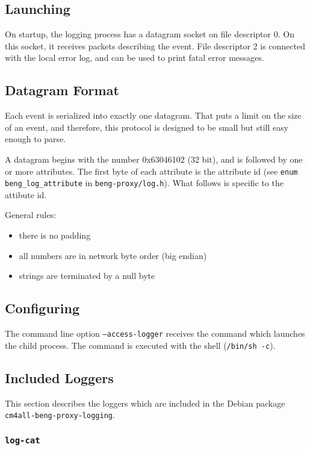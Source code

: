 \documentclass[a4paper,12pt]{article}
\begin{document}
\subsection{Launching}

On startup, the logging process has a datagram socket on file
descriptor 0.  On this socket, it receives packets describing the
event.  File descriptor 2 is connected with the local error log, and
can be used to print fatal error messages.

\subsection{Datagram Format}

Each event is serialized into exactly one datagram.  That puts a limit
on the size of an event, and therefore, this protocol is designed to
be small but still easy enough to parse.

A datagram begins with the number 0x63046102 (32 bit), and is followed
by one or more attributes.  The first byte of each attribute is the
attribute id (see \texttt{enum beng\_log\_attribute} in
\texttt{beng-proxy/log.h}).  What follows is specific to the attibute
id.

General rules:

\begin{itemize}
\item there is no padding
\item all numbers are in network byte order (big endian)
\item strings are terminated by a null byte
\end{itemize}

\subsection{Configuring}

The command line option \texttt{--access-logger} receives the command
which launches the child process.  The command is executed with the
shell (\texttt{/bin/sh -c}).

\subsection{Included Loggers}

This section describes the loggers which are included in the Debian
package \texttt{cm4all-beng-proxy-logging}.

\subsubsection{\texttt{log-cat}}
\end{document}
